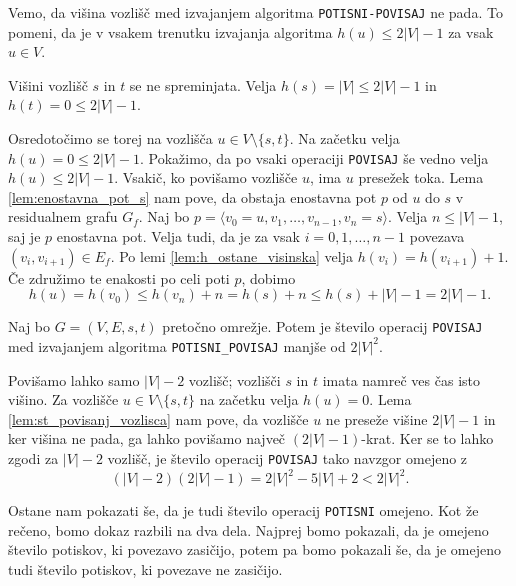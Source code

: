 \documentclass[mat1]{fmfdelo}
\begin{document}
\begin{opomba}
Vemo, da višina vozlišč med izvajanjem algoritma \texttt{POTISNI-POVISAJ} ne pada. To pomeni, da je v vsakem trenutku izvajanja algoritma $h(u) \leq 2|V| - 1$ za vsak $u \in V$.
\end{opomba}

\begin{dokaz}
Višini vozlišč $s$ in $t$ se ne spreminjata. Velja $h(s) = |V| \leq 2|V| -1$ in $h(t) = 0 \leq 2|V|-1$.

Osredotočimo se torej na vozlišča $u \in V \setminus \{s,t\}$. Na začetku velja $h(u) = 0 \leq 2|V|-1$. Pokažimo, da po vsaki operaciji \texttt{POVISAJ} še vedno velja $h(u) \leq 2|V|-1$. Vsakič, ko povišamo vozlišče $u$, ima $u$ presežek toka. Lema \ref{lem:enostavna_pot_s} nam pove, da obstaja enostavna pot $p$ od $u$ do $s$ v residualnem grafu $G_f$. Naj bo $p = \langle v_0 = u, v_1, \dotsc, v_{n-1}, v_n = s\rangle$. Velja $n \leq |V|-1$, saj je $p$ enostavna pot. Velja tudi, da je za vsak $i = 0,1,\dotsc,n-1$ povezava $(v_i, v_{i+1}) \in E_f$. Po lemi \ref{lem:h_ostane_visinska} velja $h(v_i) = h(v_{i+1}) +1$. Če združimo te enakosti po celi poti $p$, dobimo \[h(u) = h(v_0) \leq h(v_n) + n = h(s) + n \leq h(s) + |V| - 1 = 2|V| - 1.\]
\end{dokaz}

\begin{posledica}\label{pos:om_st_op_povisaj}
Naj bo $G=(V,E,s,t)$ pretočno omrežje. Potem je število operacij \texttt{POVISAJ} med izvajanjem algoritma \texttt{POTISNI\_POVISAJ} manjše od $2|V|^2$.
\end{posledica}

\begin{dokaz}
Povišamo lahko samo $|V| -2$ vozlišč; vozlišči $s$ in $t$ imata namreč ves čas isto višino. Za vozlišče $u \in V \setminus \{s,t\}$ na začetku velja $h(u) = 0$. Lema \ref{lem:st_povisanj_vozlisca} nam pove, da vozlišče $u$ ne preseže višine $2|V| - 1$ in ker višina ne pada, ga lahko povišamo največ $(2|V|-1)$-krat. Ker se to lahko zgodi za $|V|-2$ vozlišč, je število operacij \texttt{POVISAJ} tako navzgor omejeno z \[(|V|-2)(2|V|-1) = 2|V|^2 - 5|V| + 2 < 2|V|^2.\]
\end{dokaz}

Ostane nam pokazati še, da je tudi število operacij \texttt{POTISNI} omejeno. Kot že rečeno, bomo dokaz razbili na dva dela. Najprej bomo pokazali, da je omejeno število potiskov, ki povezavo zasičijo, potem pa bomo pokazali še, da je omejeno tudi število potiskov, ki povezave ne zasičijo.
\end{document}
